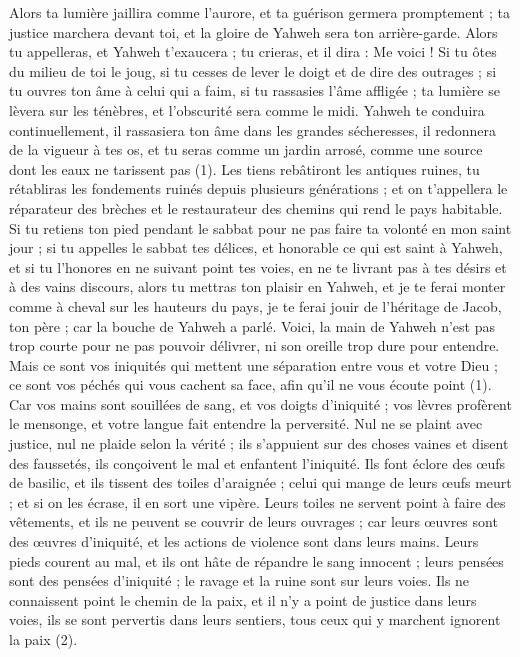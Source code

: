 \begin{multicols}{2}
{Alors ta lumière jaillira comme l’aurore, et ta guérison germera promptement ; ta justice marchera devant toi, et la gloire de Yahweh sera ton arrière-garde.
Alors tu appelleras, et Yahweh t'exaucera ; tu crieras, et il dira : Me voici ! Si tu ôtes du milieu de toi le joug, si tu cesses de lever le doigt et de dire des outrages ;
si tu ouvres ton âme à celui qui a faim, si tu rassasies l'âme affligée ; ta lumière se lèvera sur les ténèbres, et l’obscurité sera comme le midi.
Yahweh te conduira continuellement, il rassasiera ton âme dans les grandes sécheresses, il redonnera de la vigueur à tes os, et tu seras comme un jardin arrosé, comme une source dont les eaux ne tarissent pas (1).
Les tiens rebâtiront les antiques ruines, tu rétabliras les fondements ruinés depuis plusieurs générations ; et on t'appellera le réparateur des brèches et le restaurateur des chemins qui rend le pays habitable.
Si tu retiens ton pied pendant le sabbat pour ne pas faire ta volonté en mon saint jour ; si tu appelles le sabbat tes délices, et honorable ce qui est saint à Yahweh, et si tu l'honores en ne suivant point tes voies, en ne te livrant pas à tes désirs et à des vains discours,
alors tu mettras ton plaisir en Yahweh, et je te ferai monter comme à cheval sur les hauteurs du pays, je te ferai jouir de l’héritage de Jacob, ton père ; car la bouche de Yahweh a parlé.
\VerseOne{}Voici, la main de Yahweh n'est pas trop courte pour ne pas pouvoir délivrer, ni son oreille trop dure pour entendre.
Mais ce sont vos iniquités qui mettent une séparation entre vous et votre Dieu ; ce sont vos péchés qui vous cachent sa face, afin qu'il ne vous écoute point (1).
Car vos mains sont souillées de sang, et vos doigts d'iniquité ; vos lèvres profèrent le mensonge, et votre langue fait entendre la perversité.
Nul ne se plaint avec justice, nul ne plaide selon la vérité ; ils s’appuient sur des choses vaines et disent des faussetés, ils conçoivent le mal et enfantent l’iniquité.
Ils font éclore des œufs de basilic, et ils tissent des toiles d'araignée ; celui qui mange de leurs œufs meurt ; et si on les écrase, il en sort une vipère.
Leurs toiles ne servent point à faire des vêtements, et ils ne peuvent se couvrir de leurs ouvrages ; car leurs œuvres sont des œuvres d’iniquité, et les actions de violence sont dans leurs mains.
Leurs pieds courent au mal, et ils ont hâte de répandre le sang innocent ; leurs pensées sont des pensées d’iniquité ; le ravage et la ruine sont sur leurs voies.
Ils ne connaissent point le chemin de la paix, et il n'y a point de justice dans leurs voies, ils se sont pervertis dans leurs sentiers, tous ceux qui y marchent ignorent la paix (2).
}
\end{multicols}
